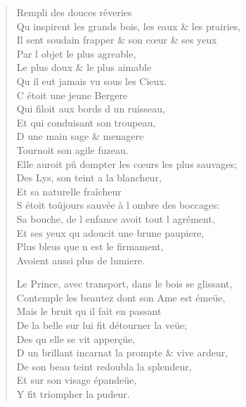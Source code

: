 \begin{verse}
\vin Rempli des douces rêveries \\
Qu\textquotesingle{} inspirent les grands bois, les eaux \& les prairies, \\
Il sent soudain frapper \& son cœur \& ses yeux \\
\vin Par l\textquotesingle{} objet le plus agreable, \\
\vin Le plus doux \& le plus aimable \\
\vin Qu\textquotesingle{} il eut jamais vu sous les Cieux. \\
\vin C\textquotesingle{} étoit une jeune Bergere \\
\vin Qui filoit aux bords d\textquotesingle{} un ruisseau, \\
\vin Et qui conduisant son troupeau, \\
\vin D\textquotesingle{} une main sage \& menagere \\
\vin Tournoit son agile fuzeau. \\
Elle auroit pû dompter les cœurs les plus sauvages; \\
\vin Des Lys, son teint a la blancheur, \\
\vin Et sa naturelle fraîcheur \\
S\textquotesingle{} étoit toûjours sauvée à l\textquotesingle{} ombre des boccages: \\
Sa bouche, de l\textquotesingle{} enfance avoit tout l\textquotesingle{} agrément, \\
Et ses yeux qu\textquotesingle{} adoucit une brune paupiere, \\
\vin Plus bleus que n\textquotesingle{} est le firmament, \\
\vin Avoient aussi plus de lumiere.

Le Prince, avec transport, dans le bois se glissant, \\
Contemple les beautez dont son Ame est émeüe, \\
\vin Mais le bruit qu\textquotesingle{} il fait en passant \\
De la belle sur lui fit détourner la veüe; \\
\vin Des qu\textquotesingle{} elle se vit apperçüe, \\
D\textquotesingle{} un brillant incarnat la prompte \& vive ardeur, \\
\vin De son beau teint redoubla la splendeur, \\
\vin Et sur son visage épandeüe, \\
\vin Y fit triompher la pudeur.


\end{verse}
